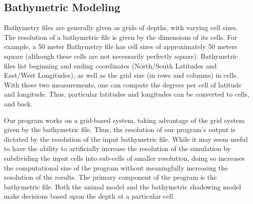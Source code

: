 \subsection{Bathymetric Modeling}
Bathymetry files are generally given as grids of depths, with varying cell sizes.  The resolution of a bathymetric file is given by the dimensions of its cells.  For example, a 50 meter Bathymetry file has cell sizes of approximately 50 meters square (although these cells are not necessarily perfectly square).  Bathymetric files list beginning and ending coordinates (North/South Latitudes and East/West Longitudes), as well as the grid size (in rows and columns) in cells.  With these two measurements, one can compute the degrees per cell of latitude and longitude.  Thus, particular latitudes and longitudes can be converted to cells, and back.  

Our program works on a grid-based system, taking advantage of the grid system given by the bathymetric file.  Thus, the resolution of our program's output is dictated by the resolution of the input bathymetric file.  While it may seem useful to have the ability to artificially increase the resolution of the simulation by subdividing the input cells into sub-cells of smaller resolution, doing so increases the computational size of the program without meaningfully increasing the resolution of the results.  The primary component of the program is the bathymetric file.  Both the animal model and the bathymetric shadowing model make decisions based upon the depth at a particular cell.  

